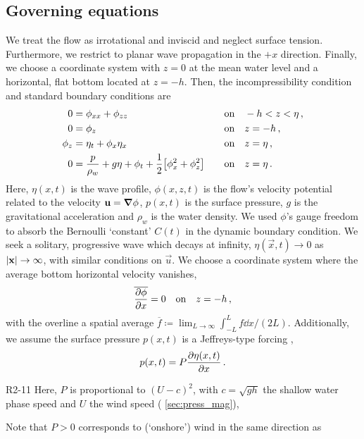 \documentclass{jfm}
\begin{document}
\subsection{\label{sec:governing} Governing equations}
We treat the flow as irrotational and inviscid and neglect surface
tension.
Furthermore, we restrict to planar wave propagation in the $+x$
direction.
Finally, we choose a coordinate system with $z=0$ at the mean water
level and a horizontal, flat bottom located at $z=-h$.
Then, the incompressibility condition and standard boundary conditions
are
\begin{alignat}{2}
  0 &= \phi_{xx} + \phi_{zz} &&\qq{on}
  -h < z < \eta \,, \label{eq:laplace}\\
  0 &= \phi_{z} &&\qq{on} z=-h \,, \label{eq:bottom_bc}\\
  \phi_{z} &= \eta_{t} + \phi_{x} \eta_{x} &&\qq{on} z = \eta \,,
  \label{eq:kinematic_bc}\\
  0 &= \frac{p}{\rho_w} + g\eta + \phi_{t} +
  \frac{1}{2} \bqty{\phi_{x}^2 + \phi_{z}^2} &&\qq{on} z=
  \eta \,. \label{eq:dynamic_bc}
\end{alignat}
Here, $\eta(x,t)$ is the wave profile, $\phi(x,z,t)$ is the flow's
velocity potential related to the velocity $\mathbf{\bm{u}} = \grad{\phi}$,
$p(x,t)$ is the surface pressure, $g$ is the gravitational acceleration
and $\rho_w$ is the water density.
We used $\phi$'s gauge freedom to absorb the Bernoulli `constant'
$C(t)$ in the dynamic boundary condition.
We seek a solitary, progressive wave which decays at infinity,
$\eta(\vec{x},t) \to 0$ as $\abs{\mathbf{\bm{x}}} \to \infty$, with similar
conditions on $\vec{u}$.
We choose a coordinate system where the average bottom horizontal
velocity vanishes,
\begin{equation}
  \overline{ \pdv{\phi}{x} } = 0 \qq{on} z=-h \,,
  \label{eq:bot_bc_horz}
\end{equation}
with the overline a spatial average $\overline{f} \coloneqq
\lim_{L\to\infty} \int_{-L}^{L} f \dd{x} / (2L)$.
Additionally, we assume the surface pressure $p(x,t)$ is a Jeffreys-type
forcing \citep{jeffreys1925formation},
\begin{equation}
  p(x,t) = P \pdv{\eta(x,t)}{x} \,.
  \label{eq:press_def}
\end{equation}
\begin{LineLabel}{R2-11}
Here, $P$ is proportional to $(U-c)^2$, with $c=\sqrt{gh}$ the shallow
water phase speed and $U$ the wind speed (\cf{} \cref{sec:press_mag}),
\end{LineLabel}
Note that $P>0$ corresponds to (`onshore') wind in the same direction as
\end{document}
